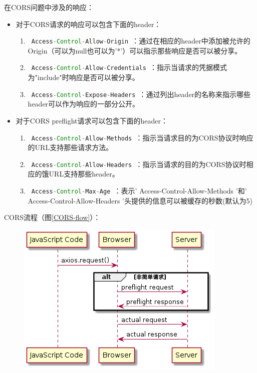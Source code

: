 \begin{enumerate}
\begin{itemize}
        \end{itemize}
        在CORS问题中涉及的响应：
        \begin{itemize}
          \item 对于CORS请求的响应可以包含下面的header：
                \begin{enumerate}
                  \item \lstinline[language = Java]| Access-Control-Allow-Origin |：通过在相应的header中添加被允许的Origin（可以为null也可以为'*'）可以指示那些响应是否可以被分享。
                  \item \lstinline[language = Java]| Access-Control-Allow-Credentials |：指示当请求的凭据模式为"include"时响应是否可以被分享。
                  \item \lstinline[language = Java]| Access-Control-Expose-Headers |：通过列出header的名称来指示哪些header可以作为响应的一部分公开。
                \end{enumerate}
          \item 对于CORS preflight请求可以包含下面的header：
                \begin{enumerate}
                  \item \lstinline[language = Java]| Access-Control-Allow-Methods |：指示当请求目的为CORS协议时响应的URL支持那些请求方法。
                  \item \lstinline[language = Java]| Access-Control-Allow-Headers |：指示当请求的目的为CORS协议时相应的饿URL支持那些header。
                  \item \lstinline[language = Java]| Access-Control-Max-Age |：表示' Access-Control-Allow-Methods '和' Access-Control-Allow-Headers '头提供的信息可以被缓存的秒数(默认为5)
                \end{enumerate}
        \end{itemize}
        CORS流程（图\ref{CORS-flow}）：
        \begin{figure}[H]
          \centering
          \includegraphics[scale = 0.6]{out/uml/时序图/CORS-flow/CORS-flow.png}

\end{figure}
\end{enumerate}
